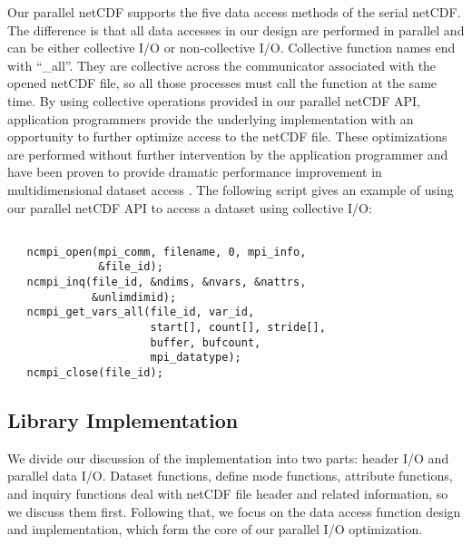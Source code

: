 \documentclass[10pt,twocolumn]{article}          %
\begin{document}
Our parallel netCDF supports the five data access methods of the serial netCDF.
 The difference is that all data accesses in our design are performed in parallel and can
be either collective I/O or non-collective I/O. Collective function names end with ``\_all''. They
are collective across the communicator associated with the opened netCDF file, so all those
processes must call the function at the same time. By using collective operations provided in our
parallel netCDF API, application programmers provide the underlying implementation with an
opportunity to further optimize access to the netCDF file. These optimizations are performed
without further intervention by the application programmer and have been proven to provide dramatic  
performance improvement in multidimensional dataset access \cite{ThGL99}. The following script gives an
example of using our parallel netCDF API to access a dataset using collective I/O:

{\scriptsize \setlength{\parskip}{-0.3pc}

\begin{verbatim}

   ncmpi_open(mpi_comm, filename, 0, mpi_info,
              &file_id);
   ncmpi_inq(file_id, &ndims, &nvars, &nattrs,
             &unlimdimid);
   ncmpi_get_vars_all(file_id, var_id,
                      start[], count[], stride[],
                      buffer, bufcount,
                      mpi_datatype);
   ncmpi_close(file_id);

\end{verbatim}
}

\subsection{Library Implementation}

We divide our discussion of the implementation into two parts: header I/O and parallel data I/O.
Dataset functions, define mode functions, attribute functions, and inquiry functions deal with
netCDF file header and related information, so we discuss them first. Following that, we focus on
the data access function design and implementation, which form the core of our parallel I/O
optimization.

\end{document}
